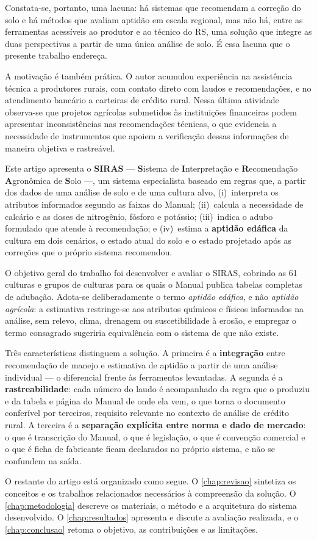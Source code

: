 Constata-se, portanto, uma lacuna: há sistemas que recomendam a correção do solo e há
métodos que avaliam aptidão em escala regional, mas não há, entre as ferramentas
acessíveis ao produtor e ao técnico do RS, uma solução que integre as duas perspectivas
a partir de uma única análise de solo. É essa lacuna que o presente trabalho endereça.

A motivação é também prática. O autor acumulou experiência na assistência técnica a
produtores rurais, com contato direto com laudos e recomendações, e no atendimento
bancário a carteiras de crédito rural. Nessa última atividade observa-se que projetos
agrícolas submetidos às instituições financeiras podem apresentar inconsistências nas
recomendações técnicas, o que evidencia a necessidade de instrumentos que apoiem a
verificação dessas informações de maneira objetiva e rastreável.

Este artigo apresenta o \textbf{SIRAS} --- \textbf{S}istema de \textbf{I}nterpretação e
\textbf{R}ecomendação \textbf{A}gronômica de \textbf{S}olo ---, um sistema especialista
baseado em regras que, a partir dos dados de uma análise de solo e de uma cultura alvo,
(i)~interpreta os atributos informados segundo as faixas do Manual; (ii)~calcula a
necessidade de calcário e as doses de nitrogênio, fósforo e potássio; (iii)~indica o
adubo formulado que atende à recomendação; e (iv)~estima a \textbf{aptidão edáfica} da
cultura em dois cenários, o estado atual do solo e o estado projetado após as correções
que o próprio sistema recomendou.

O objetivo geral do trabalho foi desenvolver e avaliar o SIRAS, cobrindo as 61 culturas
e grupos de culturas para os quais o Manual publica tabelas completas de adubação.
Adota-se deliberadamente o termo \emph{aptidão edáfica}, e não \emph{aptidão agrícola}:
a estimativa restringe-se aos atributos químicos e físicos informados na análise, sem
relevo, clima, drenagem ou suscetibilidade à erosão, e empregar o termo consagrado
sugeriria equivalência com o sistema de \cite{EmbrapaAptidao2025} que não existe.

Três características distinguem a solução. A primeira é a \textbf{integração} entre
recomendação de manejo e estimativa de aptidão a partir de uma análise individual ---
o diferencial frente às ferramentas levantadas. A segunda é a \textbf{rastreabilidade}:
cada número do laudo é acompanhado da regra que o produziu e da tabela e página do
Manual de onde ela vem, o que torna o documento conferível por terceiros, requisito
relevante no contexto de análise de crédito rural. A terceira é a \textbf{separação
explícita entre norma e dado de mercado}: o que é transcrição do Manual, o que é
legislação, o que é convenção comercial e o que é ficha de fabricante ficam declarados
no próprio sistema, e não se confundem na saída.

O restante do artigo está organizado como segue. O \cref{chap:revisao} sintetiza os
conceitos e os trabalhos relacionados necessários à compreensão da solução. O
\cref{chap:metodologia} descreve os materiais, o método e a arquitetura do sistema
desenvolvido. O \cref{chap:resultados} apresenta e discute a avaliação realizada, e o
\cref{chap:conclusao} retoma o objetivo, as contribuições e as limitações.
